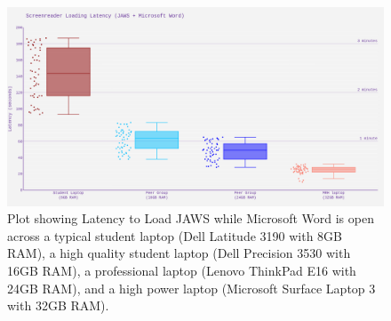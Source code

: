 \documentclass[12pt,letterpaper,twoside]{extreport}
\begin{document}
\begin{figure}[H]
	\centering
	\includegraphics[width=\textwidth]{images/ComputerRBDisplaySpecsTVIFig1.png}

	\caption[Latency to Load JAWS]{Plot showing Latency to Load JAWS while Microsoft Word is open across a typical student laptop (Dell Latitude 3190 with 8GB RAM), a high quality student laptop (Dell Precision 3530 with 16GB RAM), a professional laptop (Lenovo ThinkPad E16 with 24GB RAM), and a high power laptop (Microsoft Surface Laptop 3 with 32GB RAM).}\label{fig:figure 1}
\end{figure}
\end{document}
